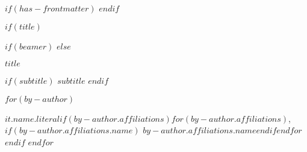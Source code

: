 
$if(has-frontmatter)$
\frontmatter
$endif$

$if(title)$

$if(beamer)$
\frame{\titlepage}
$else$


\BgThispage

\hspace{4cm}
\begin{minipage}{12.5cm}
  \vspace{5cm}
  \begin{flushleft}
  \textcolor{scporouge}{\Huge\textbf{\textsf{$title$}}}

  $if(subtitle)$
 \vspace{5mm}
  \textcolor{scporouge}{\large\textbf{\textsf{$subtitle$}}}
 \vspace{5mm}
  $endif$
  \vspace{20mm}
  \end{flushleft}

  $for(by-author)$

   \textbf{$it.name.literal$}$if(by-author.affiliations)$$for(by-author.affiliations)$,$if(by-author.affiliations.name)$
           $by-author.affiliations.name$$endif$$endfor$
   $endif$
 $endfor$ %
 \end{minipage}


